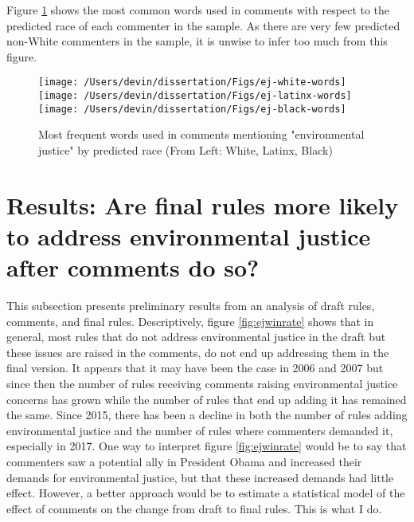 \documentclass[
      12pt,
        ]{article}
\begin{document}
Figure \ref{fig:ejwordsbyrace} shows the most common words used in comments
with respect to the predicted race of each commenter in the sample. As
there are very few predicted non-White commenters in the sample, it is
unwise to infer too much from this figure.

\begin{figure}

{\centering \texttt{[image: /Users/devin/dissertation/Figs/ej-white-words]} \texttt{[image: /Users/devin/dissertation/Figs/ej-latinx-words]} \texttt{[image: /Users/devin/dissertation/Figs/ej-black-words]} 

}

\caption{Most frequent words used in comments mentioning "environmental justice" by predicted race (From Left: White, Latinx, Black)}\label{fig:ejwordsbyrace}
\end{figure}

\hypertarget{results-are-final-rules-more-likely-to-address-environmental-justice-after-comments-do-so}{%
\section{Results: Are final rules more likely to address environmental justice after comments do so?}\label{results-are-final-rules-more-likely-to-address-environmental-justice-after-comments-do-so}}

This subsection presents preliminary results from an analysis of draft
rules, comments, and final rules. Descriptively, figure
\ref{fig:ejwinrate}
shows that in general, most rules that do not address environmental
justice in the draft but these issues are raised in the comments, do not
end up addressing them in the final version. It appears that it may have
been the case in 2006 and 2007 but since then the number of rules
receiving comments raising environmental justice concerns has grown
while the number of rules that end up adding it has remained the same.
Since 2015, there has been a decline in both the number of rules adding
environmental justice and the number of rules where commenters demanded
it, especially in 2017. One way to interpret figure
\ref{fig:ejwinrate}
would be to say that commenters saw a potential ally in President Obama
and increased their demands for environmental justice, but that these
increased demands had little effect. However, a better approach would be
to estimate a statistical model of the effect of comments on the change
from draft to final rules. This is what I do.
\end{document}
